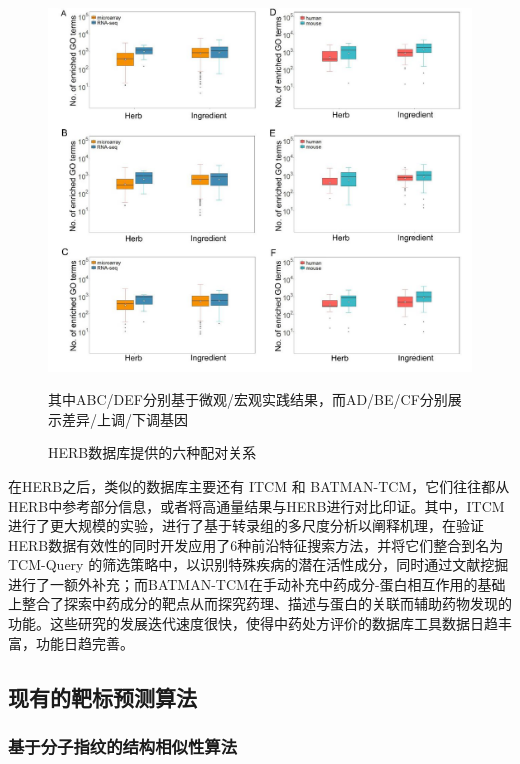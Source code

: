 \begin{figure}[H]
  \centering
  \includegraphics[width=\linewidth]{figures/HERB.png}
  \caption{HERB数据库提供的六种配对关系\cite{Fang_Dong_Liu_Guo_Zhao_Zhang_Bu_Liu_Huo_Cao_et_al._2021}}
  其中ABC/DEF分别基于微观/宏观实践结果，而AD/BE/CF分别展示差异/上调/下调基因
  \label{fig:HERB}
\end{figure}

在HERB之后，类似的数据库主要还有 ITCM 和 BATMAN-TCM，它们往往都从HERB中参考部分信息，或者将高通量结果与HERB进行对比印证。其中，ITCM进行了更大规模的实验，进行了基于转录组的多尺度分析以阐释机理，在验证HERB数据有效性的同时开发应用了6种前沿特征搜索方法，并将它们整合到名为 TCM-Query 的筛选策略中，以识别特殊疾病的潜在活性成分，同时通过文献挖掘进行了一额外补充\cite{Tian_Zhang_Yuan_Wang_Lv_Wang_Fang_Fu_Yang_Zu_et_al._2023}；而BATMAN-TCM在手动补充中药成分-蛋白相互作用的基础上整合了探索中药成分的靶点从而探究药理、描述与蛋白的关联而辅助药物发现的功能\cite{Kong_Liu_Zhang_Cheng_Mei_Li_Liu_Diao_Ma_Jiang_et_al._2024}。这些研究的发展迭代速度很快，使得中药处方评价的数据库工具数据日趋丰富，功能日趋完善。

\subsection{现有的靶标预测算法}

\subsubsection{基于分子指纹的结构相似性算法}


